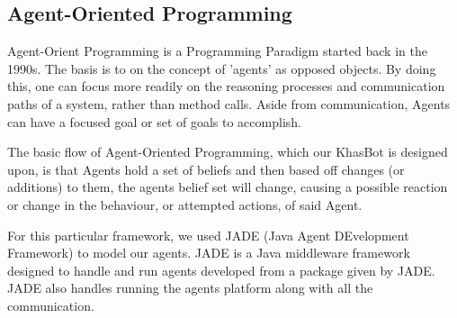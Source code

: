 \documentclass[letterpaper]{article}
\begin{document}
\subsection{Agent-Oriented Programming}
Agent-Orient Programming is a Programming Paradigm started back in the 1990s.  The basis is to on the concept of 'agents' as opposed objects.  By doing this, one can focus more readily on the reasoning processes and communication paths of a system, rather than method calls.  Aside from communication, Agents can have a focused goal or set of goals to accomplish.

The basic flow of Agent-Oriented Programming, which our KhasBot is designed upon, is that Agents hold a set of beliefs and then based off changes (or additions) to them, the agents belief set will change, causing a possible reaction or change in the behaviour, or attempted actions, of said Agent.

For this particular framework, we used JADE (Java Agent DEvelopment Framework) to model our agents.  JADE is a Java middleware framework designed to handle and run agents developed from a package given by JADE.  JADE also handles running the agents platform along with all the communication.
\end{document}
